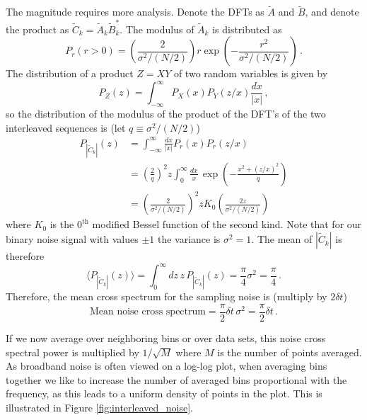 \documentclass[twocolumn]{article}
\begin{document}
The magnitude requires more analysis.
Denote the DFTs as $\tilde{A}$ and $\tilde{B}$, and denote the product as $\tilde{C}_k = \tilde{A}_k \tilde{B}_k^*$.
The modulus of $\tilde{A}_k$ is distributed as
\begin{equation}
P_r(r>0) = \left( \frac{2}{\sigma^2 / (N/2)} \right) r \exp \left( - \frac{r^2}{\sigma^2 / (N/2)} \right) \, .
\end{equation}
The distribution of a product $Z = XY$ of two random variables is given by
\begin{equation}
P_Z(z) = \int_{-\infty}^\infty P_X(x) P_Y(z/x) \frac{dx}{|x|} \, ,
\end{equation}
so the distribution of the modulus of the product of the DFT's of the two interleaved sequences is (let $q \equiv \sigma^2 / (N/2)$)
\begin{align}
P_{\left\lvert \tilde{C}_k \right \rvert}(z)
&= \int_{-\infty}^\infty \frac{dx}{|x|} P_r(x) P_r(z/x) \nonumber \\
&= \left( \frac{2}{q} \right)^2
z \int_0^\infty \frac{dx}{x} \,
\exp \left( - \frac{x^2 + (z/x)^2}{q} \right) \nonumber \\
&= \left( \frac{2}{\sigma^2 / (N/2)} \right)^2
z K_0 \left( \frac{2z}{\sigma^2 / (N/2)} \right)
\end{align}
where $K_0$ is the $0^\text{th}$ modified Bessel function of the second kind.
Note that for our binary noise signal with values $\pm 1$ the variance is $\sigma^2 = 1$.
The mean of $\left \lvert \tilde{C}_k \right \rvert$ is therefore
\begin{equation}
\langle P_{\left \lvert \tilde{C}_k \right\rvert}(z) \rangle
= \int_0^\infty dz \, z \, P_{\left \lvert \tilde{C}_k \right \rvert}(z)
= \frac{\pi}{4} \sigma^2 = \frac{\pi}{4}\, .
\end{equation}
Therefore, the mean cross spectrum for the sampling noise is (multiply by $2 \delta t$)
\begin{equation}
\text{Mean noise cross spectrum} = \frac{\pi}{2} \delta t \, \sigma^2 = \frac{\pi}{2} \delta t \, .
\end{equation}

If we now average over neighboring bins or over data sets, this noise cross spectral power is multiplied by $1/\sqrt{M}$ where $M$ is the number of points averaged.
As broadband noise is often viewed on a log-log plot, when averaging bins together we like to increase the number of averaged bins proportional with the frequency, as this leads to a uniform density of points in the plot.
This is illustrated in Figure \ref{fig:interleaved_noise}.
\end{document}
